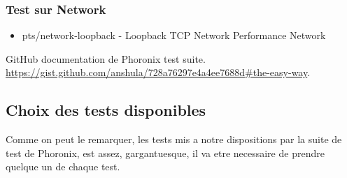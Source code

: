\documentclass[french]{article}
\begin{document}
\subsubsection{Test sur Network}
\begin{itemize}
\item pts/network-loopback           - Loopback TCP Network Performance    Network
\end{itemize}
\newpage
\begin{thebibliography}{9}

         GitHub documentation de Phoronix test suite.
          \url{https://gist.github.com/anshula/728a76297e4a4ee7688d#the-easy-way}.

\subsection{Choix des tests disponibles}
Comme on peut le remarquer, les tests mis a notre dispositions par la suite de test de Phoronix, est assez, gargantuesque, il va etre necessaire de prendre quelque un de chaque test.

\end{thebibliography}
\end{document}
